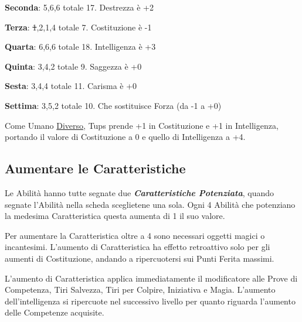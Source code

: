 \begin{multicols}{2}
\begin{changemargin}{0.3cm}{0.3cm}
\begin{tcolorbox}[title = Tiriamo le Caratteristiche di Tups]
		\textbf{Seconda}: 5,6,6 totale 17. Destrezza è +2

		\textbf{Terza}: \st{1},2,1,4 totale 7. Costituzione è -1

		\textbf{Quarta}: 6,6,6 totale 18. Intelligenza è +3

		\textbf{Quinta}: 3,4,2 totale 9. Saggezza è +0

		\textbf{Sesta}: 3,4,4 totale 11. Carisma è +0

		\textbf{Settima}: 3,5,2 totale 10. Che sostituisce Forza (da -1 a +0)

		Come Umano \hyperlink{diverso}{Diverso}, Tups prende +1 in Costituzione e +1 in Intelligenza, portando il valore di Costituzione a 0 e quello di Intelligenza a +4.

\end{tcolorbox}\end{changemargin}

\subsection{Aumentare le Caratteristiche}\label{aumentarelecaratteristiche}\hypertarget{aumentarelecaratteristiche}{}

Le Abilità hanno tutte segnate due \emph{\textbf{Caratteristiche Potenziata}}, quando segnate l'Abilità nella scheda sceglietene una sola. Ogni 4 Abilità che potenziano la medesima Caratteristica questa aumenta di 1 il suo valore.

Per aumentare la Caratteristica oltre a 4 sono necessari oggetti magici o incantesimi. L'aumento di Caratteristica ha effetto retroattivo solo per gli aumenti di Costituzione, andando a ripercuotersi sui Punti Ferita massimi.

L'aumento di Caratteristica applica immediatamente il modificatore alle Prove di Competenza, Tiri Salvezza, Tiri per Colpire, Iniziativa e Magia. L'aumento dell'intelligenza si ripercuote nel successivo livello per quanto riguarda l'aumento delle Competenze acquisite.

\medskip


\end{multicols}
